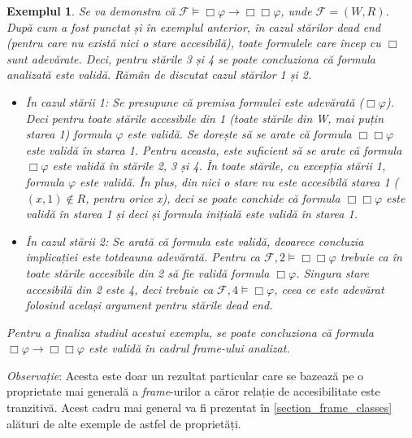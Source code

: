 \documentclass[12pt, openany]{book}
\newtheorem{example}[definition]{Exemplul} %
\newcommand{\mysectionreference}[1]{\autoref{#1}}
\begin{document}
\begin{example}
                Se va demonstra că $\mathcal{F} \vDash \Box \varphi \rightarrow \Box \Box \varphi$, unde $\mathcal{F}=(W,R)$.
                După cum a fost punctat și în exemplul anterior, în cazul stărilor \textit{dead end} (pentru care nu există
                nici o stare accesibilă), toate formulele care încep cu $\Box$ sunt adevărate. Deci, pentru stările 3 și 4 
                se poate concluziona că formula analizată este validă. Rămân de discutat cazul stărilor 1 și 2. 
                \begin{itemize}
                    \item În cazul stării 1: Se presupune că premisa formulei este adevărată ($\Box \varphi$). Deci pentru toate 
                    stările accesibile din 1 (toate stările din W, mai puțin starea 1) formula $\varphi$ este validă. Se 
                    dorește să se arate că formula $\Box \Box \varphi$ este validă în starea 1. Pentru aceasta, este suficient
                    să se arate că formula $\Box \varphi$ este validă în stările 2, 3 și 4. În toate stările, cu excepția 
                    stării 1, formula $\varphi$ este validă. În plus, din nici o stare nu este accesibilă starea 1 
                    ($(x,1) \notin R$, pentru orice x), deci se poate conchide că formula $\Box \Box \varphi$ este validă în
                    starea 1 și deci și formula inițială este validă în starea 1.
                    \item În cazul stării 2: Se arată că formula este validă, deoarece concluzia implicației este totdeauna 
                    adevărată. Pentru ca $\mathcal{F},2 \vDash \Box \Box \varphi$ trebuie ca în toate stările accesibile din 2 
                    să fie validă formula $\Box \varphi$. Singura stare accesibilă din 2 este 4, deci trebuie ca $\mathcal{F}, 4
                    \vDash \Box \varphi$, ceea ce este adevărat folosind același argument pentru stările \textit{dead end}.
                \end{itemize}
                Pentru a finaliza studiul acestui exemplu, se poate concluziona că formula $\Box \varphi \rightarrow \Box 
                \Box \varphi$ este validă în cadrul \textit{frame}-ului analizat.
            \end{example}
            
            \par{}
                \noindent \textit{Observație}: Acesta este doar un rezultat particular care se bazează pe o proprietate mai 
                generală a \textit{frame}-urilor a căror relație de accesibilitate este tranzitivă. Acest cadru mai general 
                va fi prezentat în \mysectionreference{section_frame_classes} alături de alte exemple de astfel de
                proprietăți.
\end{document}
